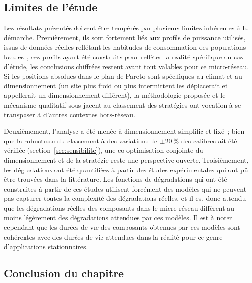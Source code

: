 \subsection{Limites de l'étude}

Les résultats présentés doivent être tempérés par plusieurs limites inhérentes à la démarche. Premièrement, ils sont fortement liés aux profils de puissance utilisés, issus de données réelles reflétant les habitudes de consommation des populations locales~; ces profils ayant été construits pour refléter la réalité spécifique du cas d'étude, les conclusions chiffrées restent avant tout valables pour ce micro-réseau. Si les positions absolues dans le plan de Pareto sont spécifiques au climat et au dimensionnement (un site plus froid ou plus intermittent les déplacerait et appellerait un dimensionnement différent), la méthodologie proposée et le mécanisme qualitatif sous-jacent au classement des stratégies ont vocation à se transposer à d'autres contextes hors-réseau.

Deuxièmement, l'analyse a été menée à dimensionnement simplifié et fixé~; bien que la robustesse du classement à des variations de $\pm\SI{20}{\percent}$ des calibres ait été vérifiée (section~\ref{sec:sensibilite}), une co-optimisation conjointe du dimensionnement et de la stratégie reste une perspective ouverte. Troisièmement, les dégradations ont été quantifiées à partir des études expérimentales qui ont pû être trouvées dans la littérature. Les fonctions de dégradations qui ont été construites à partir de ces études utilisent forcément des modèles qui ne peuvent pas capturer toutes la complexité des dégradations réelles, et il est donc attendu que les dégradations réelles des composants dans le micro-réseau diffèrent au moins légèrement des dégradations attendues par ces modèles. Il est à noter cependant que les durées de vie des composants obtenues par ces modèles sont cohérentes avec des durées de vie attendues dans la réalité pour ce genre d'applications stationnaires.

\subsection{Conclusion du chapitre}

